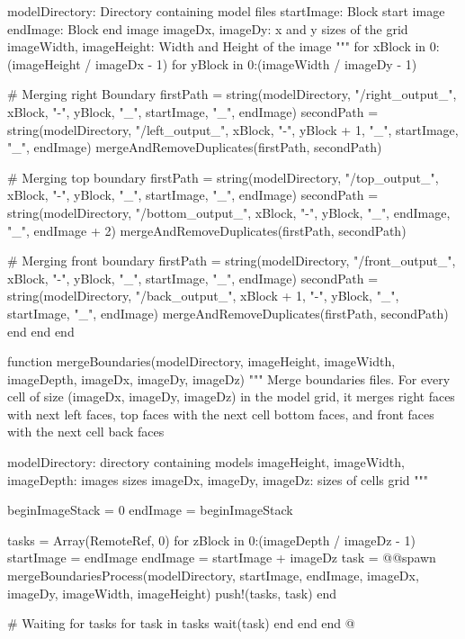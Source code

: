 \documentclass[11pt,oneside]{article}	%
\begin{document}
{  modelDirectory: Directory containing model files
  startImage: Block start image 
  endImage: Block end image
  imageDx, imageDy: x and y sizes of the grid
  imageWidth, imageHeight: Width and Height of the image
  """
  for xBlock in 0:(imageHeight / imageDx - 1)
    for yBlock in 0:(imageWidth / imageDy - 1)

      # Merging right Boundary
      firstPath = string(modelDirectory, "/right_output_", xBlock, "-", yBlock, "_", startImage, "_", endImage)
      secondPath = string(modelDirectory, "/left_output_", xBlock, "-", yBlock + 1, "_", startImage, "_", endImage)
      mergeAndRemoveDuplicates(firstPath, secondPath)

      # Merging top boundary
      firstPath = string(modelDirectory, "/top_output_", xBlock, "-", yBlock, "_", startImage, "_", endImage)
      secondPath = string(modelDirectory, "/bottom_output_", xBlock, "-", yBlock, "_", endImage, "_", endImage + 2)
      mergeAndRemoveDuplicates(firstPath, secondPath)

      # Merging front boundary
      firstPath = string(modelDirectory, "/front_output_", xBlock, "-", yBlock, "_", startImage, "_", endImage)
      secondPath = string(modelDirectory, "/back_output_", xBlock + 1, "-", yBlock, "_", startImage, "_", endImage)
      mergeAndRemoveDuplicates(firstPath, secondPath)
    end
  end
end

function mergeBoundaries(modelDirectory,
                         imageHeight, imageWidth, imageDepth,
                         imageDx, imageDy, imageDz)
  """
  Merge boundaries files. For every cell of size
  (imageDx, imageDy, imageDz) in the model grid,
  it merges right faces with next left faces, top faces
  with the next cell bottom faces, and front faces
  with the next cell back faces

  modelDirectory: directory containing models
  imageHeight, imageWidth, imageDepth: images sizes
  imageDx, imageDy, imageDz: sizes of cells grid
  """

  beginImageStack = 0
  endImage = beginImageStack

  tasks = Array(RemoteRef, 0)
  for zBlock in 0:(imageDepth / imageDz - 1)
    startImage = endImage
    endImage = startImage + imageDz
    task = @@spawn mergeBoundariesProcess(modelDirectory, startImage, endImage,
                           imageDx, imageDy,
                           imageWidth, imageHeight)
    push!(tasks, task)
  end

  # Waiting for tasks
  for task in tasks
    wait(task)
  end
end
end
@}
\end{document}
